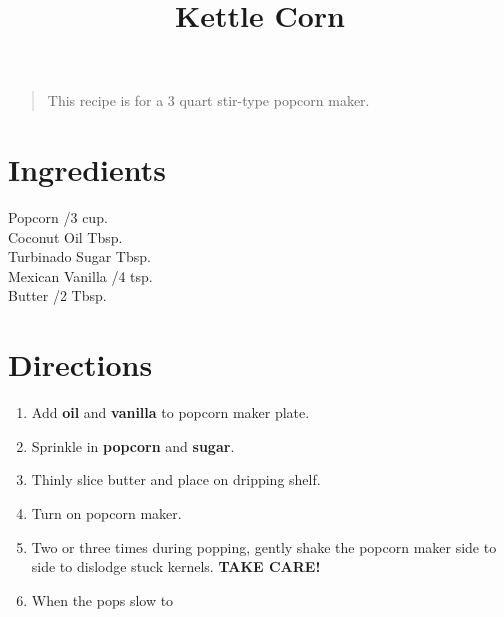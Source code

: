 \documentclass[11pt,letterpaper]{article}
\title{Kettle Corn}
\author{}
\date{}
\begin{document}
\maketitle
\thispagestyle{empty}

\begin{quote}
\small
\begin{em}
This recipe is for a 3 quart stir-type popcorn maker.
\end{em}
\end{quote}

\section*{Ingredients}
\setlength{\columnsep}{20pt}
\begin{multicols}{2}
\noindent
    Popcorn /3 cup. \\
	Coconut Oil  Tbsp. \\
	Turbinado Sugar  Tbsp. \\
	Mexican Vanilla /4 tsp. \\
	Butter /2 Tbsp. \\
\end{multicols}

\section*{Directions}

\begin{enumerate}
	\item Add \textbf{oil} and \textbf{vanilla} to popcorn maker plate.
	\item Sprinkle in \textbf{popcorn} and \textbf{sugar}.
	\item Thinly slice butter and place on dripping shelf.
	\item Turn on popcorn maker.
	\item Two or three times during popping, gently shake the popcorn maker side to side to dislodge stuck kernels. \textbf{TAKE CARE!}
	\item When the pops slow to 
\end{enumerate}
\end{document}
